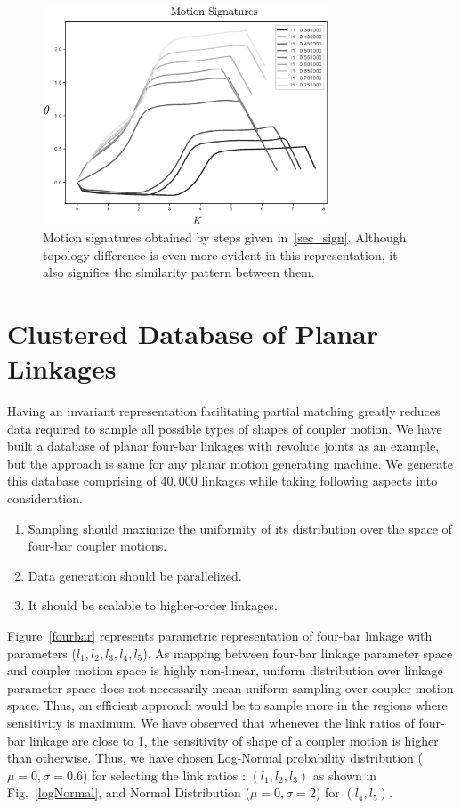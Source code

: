 \documentclass[twocolumn,10pt]{asme2e}
\begin{document}
\begin{figure}
\centering
\includegraphics[width=240pt]{figure/fig_sa_motion_signatures.eps}
  \caption{Motion signatures obtained by steps given in~\ref{sec_sign}. Although topology difference is even more evident in this representation, it also signifies the similarity pattern between them.}
\label{saMotionSignatures}
\end{figure}

\section{Clustered Database of Planar Linkages}\label{sec_db_ae}
Having an invariant representation facilitating partial matching greatly reduces data required to sample all possible types of shapes of coupler motion.
We have built a database of planar four-bar linkages with revolute joints as an example, but the approach is same for any planar motion generating machine.
We generate this database comprising of $40,000$ linkages while taking following aspects into consideration.
\begin{enumerate}
  \item Sampling should maximize the uniformity of its distribution over the space of four-bar coupler motions.
  \item Data generation should be parallelized.
  \item It should be scalable to higher-order linkages.
\end{enumerate}
Figure~\ref{fourbar} represents parametric representation of four-bar linkage with parameters ($l_1,l_2,l_3,l_4,l_5$).
As mapping between four-bar linkage parameter space and coupler motion space is highly non-linear, uniform distribution over linkage parameter space does not necessarily mean uniform sampling over coupler motion space.
Thus, an efficient approach would be to sample more in the regions where sensitivity is maximum.
We have observed that whenever the link ratios of four-bar linkage are close to 1, the sensitivity of shape of a coupler motion is higher than otherwise.
Thus, we have chosen Log-Normal probability distribution ($\mu = 0,\sigma = 0.6 $) for selecting the link ratios : $(l_1, l_2, l_3)$ as shown in Fig.~\ref{logNormal}, and Normal Distribution ($\mu = 0,\sigma = 2 $) for $(l_4, l_5)$.
\end{document}
